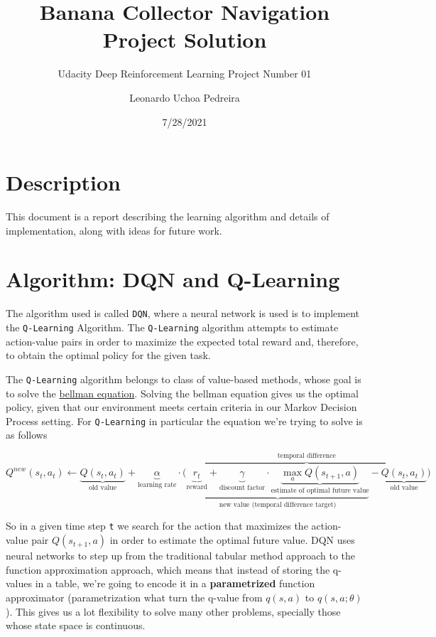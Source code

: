 \documentclass[
]{article}
\title{Banana Collector Navigation Project Solution}
\subtitle{Udacity Deep Reinforcement Learning Project Number 01}
\author{Leonardo Uchoa Pedreira}
\date{7/28/2021}
\begin{document}
\maketitle

{
\setcounter{tocdepth}{2}
\tableofcontents
}
\hypertarget{description}{%
\section{Description}\label{description}}

This document is a report describing the learning algorithm and details
of implementation, along with ideas for future work.

\pagebreak

\hypertarget{algorithm-dqn-and-q-learning}{%
\section{Algorithm: DQN and
Q-Learning}\label{algorithm-dqn-and-q-learning}}

The algorithm used is called \texttt{DQN}, where a neural network is
used is to implement the \texttt{Q-Learning} Algorithm. The
\texttt{Q-Learning} algorithm attempts to estimate action-value pairs in
order to maximize the expected total reward and, therefore, to obtain
the optimal policy for the given task.

The \texttt{Q-Learning} algorithm belongs to class of value-based
methods, whose goal is to solve the
\href{https://en.wikipedia.org/wiki/Bellman_equation}{bellman equation}.
Solving the bellman equation gives us the optimal policy, given that our
environment meets certain criteria in our Markov Decision Process
setting. For \texttt{Q-Learning} in particular the equation we're trying
to solve is as follows

\[
\displaystyle Q^{new}(s_{t},a_{t})\leftarrow \underbrace {Q(s_{t},a_{t})} _{\text{old value}}+\underbrace {\alpha } _{\text{learning rate}}\cdot \overbrace {{\bigg (}\underbrace {\underbrace {r_{t}} _{\text{reward}}+\underbrace {\gamma } _{\text{discount factor}}\cdot \underbrace {\max _{a}Q(s_{t+1},a)} _{\text{estimate of optimal future value}}} _{\text{new value (temporal difference target)}}-\underbrace {Q(s_{t},a_{t})} _{\text{old value}}{\bigg )}} ^{\text{temporal difference}} 
\]

So in a given time step \texttt{t} we search for the action that
maximizes the action-value pair \(Q(s_{t+1},a)\) in order to estimate
the optimal future value. DQN uses neural networks to step up from the
traditional tabular method approach to the function approximation
approach, which means that instead of storing the q-values in a table,
we're going to encode it in a \textbf{parametrized} function
approximator (parametrization what turn the q-value from \(q(s,a)\) to
\(q(s,a;\theta)\)). This gives us a lot flexibility to solve many other
problems, specially those whose state space is continuous.
\end{document}
